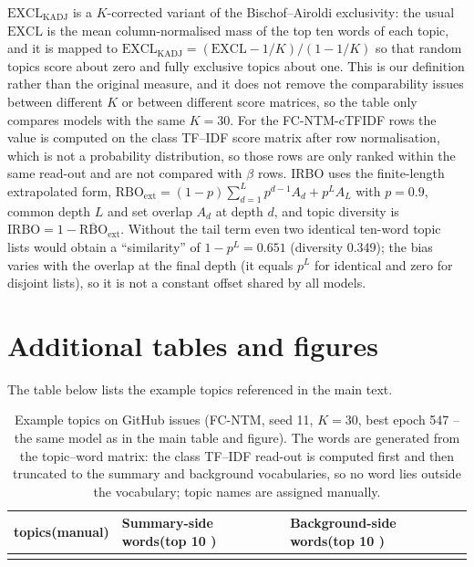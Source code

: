 \documentclass[11pt]{article}
\newcommand{\fcntm}{FC-NTM}
\begin{document}
$\mathrm{EXCL}_{\mathrm{KADJ}}$ is a $K$-corrected variant of the Bischof--Airoldi exclusivity: the
usual $\mathrm{EXCL}$ is the mean column-normalised mass of the top ten words of each topic, and it
is mapped to $\mathrm{EXCL}_{\mathrm{KADJ}}=(\mathrm{EXCL}-1/K)/(1-1/K)$ so that random topics
score about zero and fully exclusive topics about one. This is our definition rather than the
original measure, and it does not remove the comparability issues between different $K$ or between
different score matrices, so the table only compares models with the same $K=30$. For the
\fcntm{}-cTFIDF rows the value is computed on the class TF--IDF score matrix after row
normalisation, which is not a probability distribution, so those rows are only ranked within the
same read-out and are not compared with $\beta$ rows. IRBO uses the finite-length extrapolated
form, $\mathrm{RBO}_{\mathrm{ext}}=(1-p)\sum_{d=1}^{L}p^{d-1}A_d+p^{L}A_L$ with $p=0.9$, common
depth $L$ and set overlap $A_d$ at depth $d$, and topic diversity is
$\mathrm{IRBO}=1-\overline{\mathrm{RBO}}_{\mathrm{ext}}$. Without the tail term even two identical
ten-word topic lists would obtain a ``similarity'' of $1-p^{L}=0.651$ (diversity 0.349); the bias
varies with the overlap at the final depth (it equals $p^{L}$ for identical and zero for disjoint
lists), so it is not a constant offset shared by all models.

\section{Additional tables and figures}

The table below lists the example topics referenced in the main text.

\begin{table}[t]
\centering
\caption{Example topics on GitHub issues (\fcntm{}, seed 11, $K=30$, best epoch 547 -- the same model as in the main table and figure). The words are generated from the topic--word matrix: the class TF--IDF read-out is computed first and then truncated to the summary and background vocabularies, so no word lies outside the vocabulary; topic names are assigned manually.}
\label{tab:topics}
\footnotesize
\setlength{\tabcolsep}{4pt}
\begin{tabular}{@{}p{2.7cm}p{5.9cm}p{5.9cm}@{}}
\toprule
topics(manual) & Summary-side words(top 10 ) & Background-side words(top 10 ) \\
\midrule

\\   %
\bottomrule
\end{tabular}
\end{table}
\end{document}
